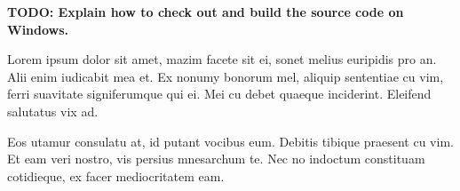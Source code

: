 \documentclass[a4paper,11pt,oneside]{report}
\begin{document}
\textbf{TODO: Explain how to check out and build the source code on Windows.}

Lorem ipsum dolor sit amet, mazim facete sit ei, sonet melius euripidis pro
an. Alii enim iudicabit mea et. Ex nonumy bonorum mel, aliquip sententiae cu
vim, ferri suavitate signiferumque qui ei. Mei cu debet quaeque
inciderint. Eleifend salutatus vix ad.

Eos utamur consulatu at, id putant vocibus eum. Debitis tibique praesent cu
vim. Et eam veri nostro, vis persius mnesarchum te. Nec no indoctum constituam
cotidieque, ex facer mediocritatem eam.
\end{document}
